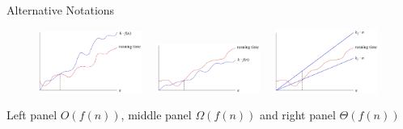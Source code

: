\documentclass[11pt,compress,t,notes=noshow, xcolor=table]{beamer}
\begin{document}
\begin{vbframe}{Alternative Notations}
\vspace*{-.4cm}
\begin{center}
\begin{figure}
  \includegraphics[width=0.3\textwidth]{figure_man/bigo.png}~~
  \includegraphics[width = 0.3\textwidth]{figure_man/bigomega.png}~~
  \includegraphics[width = 0.3\textwidth]{figure_man/bigtheta.png} \\
\end{figure}
\end{center}

Left panel $O(f(n))$, middle panel $\Omega(f(n))$ and right panel $\Theta(f(n))$


\end{vbframe}
\end{document}
